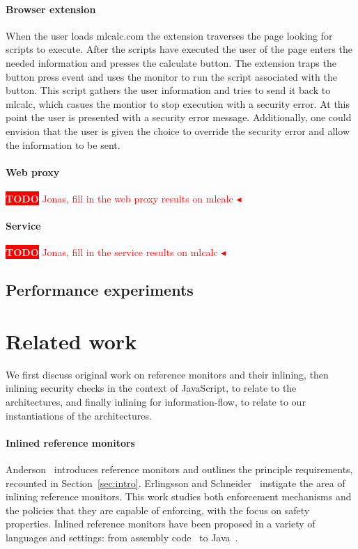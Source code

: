 \documentclass{llncs}
\newcommand{\todo}[1]{\colorbox{red}{\textcolor{white}{\sffamily\bfseries\scriptsize TODO}} \textcolor{red}{#1} \textcolor{red}{$\blacktriangleleft$}}
\begin{document}
\paragraph{Browser extension}
When the user loads mlcalc.com the extension traverses the page looking for
scripts to execute. After the scripts have executed the user of the page
enters the needed information and presses the calculate button. The extension
traps the button press event and uses the monitor to run the script associated
with the button. This script gathers the user information and tries to send
it back to mlcalc, which casues the montior to stop execution with a security 
error. At this point the user is presented with a security error message. 
Additionally, one could envision that the user is given the choice to
override the security error and allow the information to be sent.


\paragraph{Web proxy}

\todo{Jonas, fill in the web proxy results on mlcalc}


\paragraph{Service}

\todo{Jonas, fill in the service results on mlcalc}


\subsection{Performance experiments}

\section{Related work}
\label{sec:related}
We first discuss original work on reference monitors and their
inlining, then
inlining security checks in the context of
JavaScript, to relate to the architectures, 
and finally inlining for information-flow, to relate to our instantiations
of the architectures.

\paragraph{Inlined reference monitors}
Anderson~\cite{Anderson:72} introduces reference monitors and
outlines the principle requirements, recounted in Section~\ref{sec:intro}.
%
Erlingsson and Schneider~\cite{DBLP:conf/nspw/ErlingssonS99,Erlingsson:PhD04} instigate
the area of inlining reference monitors. 
This work studies both enforcement mechanisms and the policies
that they are capable of enforcing, with the focus on safety properties.
Inlined reference monitors
have been proposed in a variety of languages and settings: from
assembly code~\cite{DBLP:conf/nspw/ErlingssonS99} to Java~\cite{DBLP:conf/ecoop/DamJLP09,DBLP:journals/jcs/DamJLP10,DBLP:conf/ccs/DamGL12}.
\end{document}
